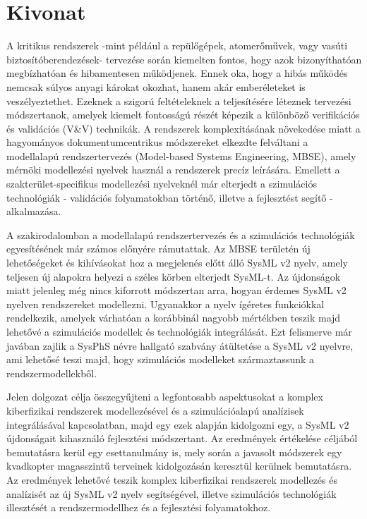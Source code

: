 \setcounter{page}{1}

\selecthungarian

\chapter*{Kivonat}

A kritikus rendszerek -mint például a repülőgépek, atomerőművek, vagy vasúti biztosítóberendezések- tervezése során kiemelten fontos, hogy azok bizonyíthatóan megbízhatóan és hibamentesen működjenek. Ennek oka, hogy a hibás működés nemcsak súlyos anyagi károkat okozhat, hanem akár emberéleteket is veszélyeztethet. Ezeknek a szigorú feltételeknek a teljesítésére léteznek tervezési módszertanok, amelyek kiemelt fontosságú részét képezik a különböző verifikációs és validációs (V\&V) technikák. A rendszerek komplexitásának növekedése miatt a hagyományos dokumentumcentrikus módszereket elkezdte felváltani a modellalapú rendszertervezés (Model-based Systems Engineering, MBSE), amely mérnöki modellezési nyelvek használ a rendszerek precíz leírására. Emellett a szakterület-specifikus modellezési nyelveknél már elterjedt a szimulációs technológiák - validációs folyamatokban történő, illetve a fejlesztést segítő - alkalmazása.

A szakirodalomban a modellalapú rendszertervezés és a szimulációs technológiák egyesítésének már számos előnyére rámutattak. Az MBSE területén új lehetőségeket és kihívásokat hoz a megjelenés előtt álló SysML v2 nyelv, amely teljesen új alapokra helyezi a széles körben elterjedt SysML-t. Az újdonságok miatt jelenleg még nincs kiforrott módszertan arra, hogyan érdemes SysML v2 nyelven rendszereket modellezni. Ugyanakkor a nyelv ígéretes funkciókkal rendelkezik, amelyek várhatóan a korábbinál nagyobb mértékben teszik majd lehetővé a szimulációs modellek és technológiák integrálását. Ezt felismerve már javában zajlik a SysPhS névre hallgató szabvány átültetése a SysML v2 nyelvre, ami lehetősé teszi majd, hogy szimulációs modelleket származtassunk a rendszermodellekből.

Jelen dolgozat célja összegyűjteni a legfontosabb aspektusokat a komplex kiberfizikai rendszerek modellezésével és a szimulációalapú analízisek integrálásával kapcsolatban, majd egy ezek alapján kidolgozni egy, a SysML v2 újdonságait kihasználó fejlesztési módszertant. Az eredmények  értékelése céljából bemutatásra kerül egy esettanulmány is, mely során a javasolt módszerek egy kvadkopter magasszintű terveinek kidolgozásán keresztül kerülnek bemutatásra. Az eredmények lehetővé teszik komplex kiberfizikai rendszerek modellezés és analízisét az új SysML v2 nyelv segítségével, illetve szimulációs technológiák illesztését a rendszermodellhez és a fejlesztési folyamatokhoz.

